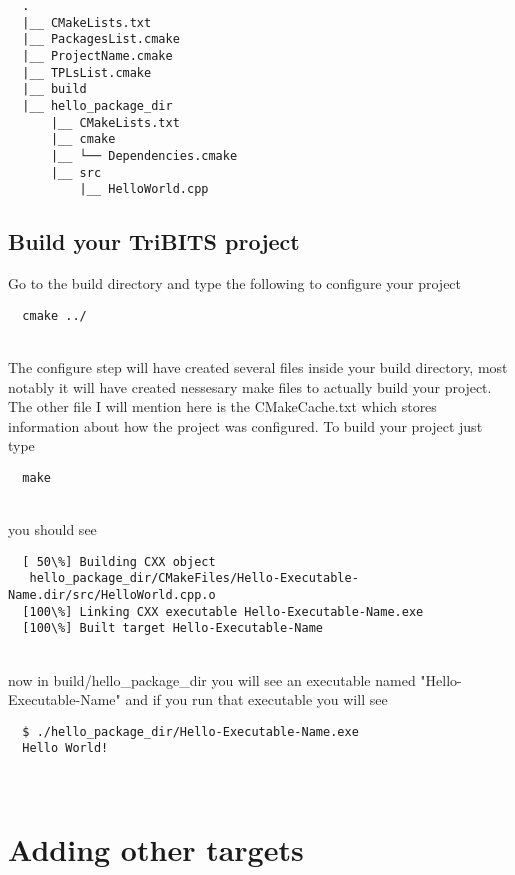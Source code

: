\documentclass[12pt]{article}
\begin{document}
\begin{verbatim}
  .
  |__ CMakeLists.txt
  |__ PackagesList.cmake
  |__ ProjectName.cmake
  |__ TPLsList.cmake
  |__ build
  |__ hello_package_dir
      |__ CMakeLists.txt
      |__ cmake
      |__ └── Dependencies.cmake
      |__ src
          |__ HelloWorld.cpp
\end{verbatim}

\subsection*{Build your TriBITS project}

Go to the build directory and type the following to configure your project

\begin{verbatim}
  cmake ../
\end{verbatim}\\
The configure step will have created several files inside your build
directory, most notably it will have created nessesary make files to
actually build your project.  The other file I will mention here is
the CMakeCache.txt which stores information about how the project was
configured. To build your project just type
\begin{verbatim}  
  make
\end{verbatim}\\
you should see
\begin{verbatim} 
  [ 50\%] Building CXX object
   hello_package_dir/CMakeFiles/Hello-Executable-Name.dir/src/HelloWorld.cpp.o
  [100\%] Linking CXX executable Hello-Executable-Name.exe
  [100\%] Built target Hello-Executable-Name
\end{verbatim}\\
now in build/hello\_package\_dir you will see an executable named
"Hello-Executable-Name" and if you run that executable you will see
\begin{verbatim}
  $ ./hello_package_dir/Hello-Executable-Name.exe 
  Hello World!
\end{verbatim}\\


\section{Adding other targets}
\end{document}
